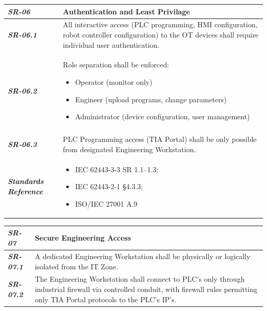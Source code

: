 \documentclass{article}
\begin{document}
\begin{tabularx}{\textwidth}{>{\bfseries}p{2.5cm} X}
    \textit{SR-06} & \textbf{Authentication and Least Privilage} \vspace{0.5em}\\
\toprule
\textit{SR-06.1} &
    All interactive access (PLC programming, HMI configuration, robot controller configuration) to the OT devices shall require individual user authentication.
    \vspace{0.5em}
\\
\textit{SR-06.2} &
    Role separation shall be enforced:
    \begin{itemize}[label=-, noitemsep, topsep=0pt, leftmargin=*]
        \item Operator (monitor only)
        \item Engineer (upload programs, change parameters)
        \item Administrator (device configuration, user management)
    \end{itemize} \vspace{1em} \\ 
    \vspace{0.5em}
    \\
\textit{SR-06.3} &
    PLC Programming access (TIA Portal) shall be only possible from designated Engineering Workstation.
    \vspace{0.5em}
    \\
\midrule
    \textit{Standards Reference} &
\begin{itemize}[label=-, noitemsep, topsep=0pt, leftmargin=*]
    \item IEC 62443-3-3 SR 1.1–1.3; 
    \item IEC 62443-2-1 §4.3.3; 
    \item ISO/IEC 27001 A.9
\end{itemize} \vspace{1em} \\ 
\end{tabularx}
\vspace{2em}

\begin{tabularx}{\textwidth}{>{\bfseries}p{2.5cm} X}
    \textit{SR-07} & \textbf{Secure Engineering Access} \vspace{0.5em}\\
\toprule
\textit{SR-07.1} &
    A dedicated Engineering Workstation shall be physically or logically isolated from the IT Zone.
    \vspace{0.5em}
\\
\textit{SR-07.2} &
    The Engineering Workstation shall connect to PLC's only through industrial firewall via controlled conduit, with firewall rules permitting only TIA Portal protocols to the PLC's IP's. 
    \vspace{0.5em}
    \\
\end{tabularx}
\vspace{2em}
\end{document}
